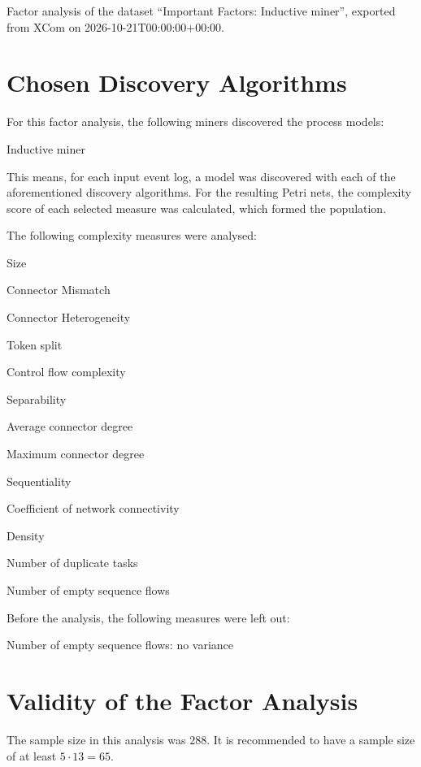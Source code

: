 \documentclass[a4paper]{article}
\begin{document}
\noindent
Factor analysis of the dataset ``Important Factors: Inductive miner'', exported from XCom on 2026-10-21T00:00:00+00:00.

\section*{Chosen Discovery Algorithms}
For this factor analysis, the following miners discovered the process models:
\begin{compactitem}
\item Inductive miner
\end{compactitem}

This means, for each input event log, a model was discovered with each of the aforementioned discovery algorithms.
For the resulting Petri nets, the complexity score of each selected measure was calculated, which formed the population.

The following complexity measures were analysed:
\begin{compactitem}
\item Size
\item Connector Mismatch
\item Connector Heterogeneity
\item Token split
\item Control flow complexity
\item Separability
\item Average connector degree
\item Maximum connector degree
\item Sequentiality
\item Coefficient of network connectivity
\item Density
\item Number of duplicate tasks
\item Number of empty sequence flows
\end{compactitem}

\noindent
Before the analysis, the following measures were left out:
\begin{compactitem}
\item Number of empty sequence flows: no variance
\end{compactitem}

\section*{Validity of the Factor Analysis}
The sample size in this analysis was $288$.
It is recommended to have a sample size of at least $5 \cdot 13 = 65$.
\end{document}
